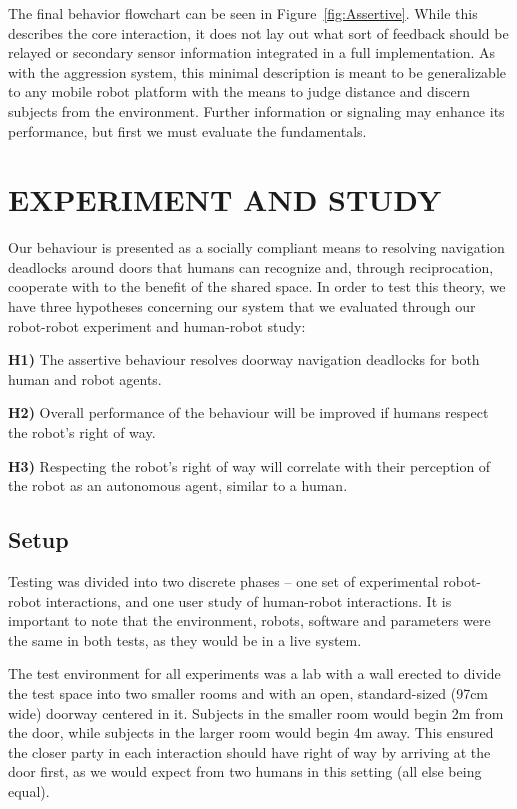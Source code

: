 \documentclass[letterpaper, 10 pt, conference]{ieeeconf}  %
\begin{document}
The final behavior flowchart can be seen in Figure~\ref{fig:Assertive}. While this describes the core interaction, it does not lay out what sort of feedback should be relayed or secondary sensor information integrated in a full implementation. As with the aggression system, this minimal description is meant to be generalizable to any mobile robot platform with the means to judge distance and discern subjects from the environment. Further information or signaling may enhance its performance, but first we must evaluate the fundamentals.


\section{EXPERIMENT AND STUDY}

Our behaviour is presented as a socially compliant means to resolving navigation deadlocks around doors that humans can recognize and, through reciprocation, cooperate with to the benefit of the shared space. In order to test this theory, we have three hypotheses concerning our system that we evaluated through our robot-robot experiment and human-robot study:

\textbf{H1)} The assertive behaviour resolves doorway navigation deadlocks for both human and robot agents.

\textbf{H2)} Overall performance of the behaviour will be improved if humans respect the robot's right of way.

\textbf{H3)} Respecting the robot's right of way will correlate with their perception of the robot as an autonomous agent, similar to a human.


\subsection{Setup}

Testing was divided into two discrete phases – one set of experimental robot-robot interactions, and one user study of human-robot interactions. It is important to note that the environment, robots, software and parameters were the same in both tests, as they would be in a live system.

The test environment for all experiments was a lab with a wall erected to divide the test space into two smaller rooms and with an open, standard-sized (97cm wide) doorway centered in it. Subjects in the smaller room would begin 2m from the door, while subjects in the larger room would begin 4m away. This ensured the closer party in each interaction should have right of way by arriving at the door first, as we would expect from two humans in this setting (all else being equal).
\end{document}
